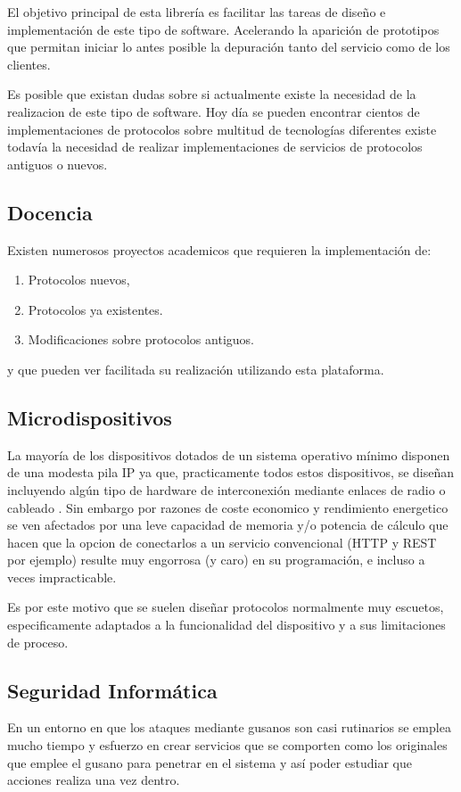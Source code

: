 \documentclass[a4paper,spanish,12pt]{book}
\begin{document}
El objetivo principal de esta librería es facilitar las tareas de diseño e implementación de este tipo de software. Acelerando la aparición de prototipos que permitan iniciar lo antes posible la depuración tanto del servicio como de los clientes.

Es posible que existan dudas sobre si actualmente existe la necesidad de la realizacion de este tipo de software. Hoy día se pueden encontrar cientos de implementaciones de protocolos sobre multitud de tecnologías diferentes existe todavía la necesidad de realizar implementaciones de servicios de protocolos antiguos o nuevos.

\subsection{Docencia}
Existen numerosos proyectos academicos que requieren la implementaci\'on de:
\begin{enumerate}
	\item Protocolos nuevos,
	\item Protocolos ya existentes.
	\item Modificaciones sobre protocolos antiguos. 
\end{enumerate}

y que pueden ver facilitada su realización utilizando esta plataforma.

\subsection{Microdispositivos}
La mayor\'ia de los dispositivos dotados de un sistema operativo m\'inimo disponen de una modesta pila IP ya que, practicamente todos estos dispositivos, se dise\~{n}an incluyendo algún tipo de hardware de interconexi\'on mediante enlaces de radio o cableado . Sin embargo por razones de coste economico y rendimiento energetico se ven afectados por una leve capacidad de memoria y/o potencia de c\'alculo que hacen que la opcion de conectarlos a un servicio convencional (HTTP y REST por ejemplo) resulte muy engorrosa (y caro) en su programaci\'on, e incluso a veces impracticable.

Es por este motivo que se suelen dise\~{n}ar protocolos normalmente muy escuetos, especificamente adaptados a la funcionalidad del dispositivo y a sus limitaciones de proceso.

\subsection{Seguridad Inform\'atica}
En un entorno en que los ataques mediante gusanos son casi rutinarios se emplea mucho tiempo y esfuerzo en crear servicios que se comporten como los originales que emplee el gusano para penetrar en el sistema y as\'i poder estudiar que acciones realiza una vez dentro.
\end{document}
